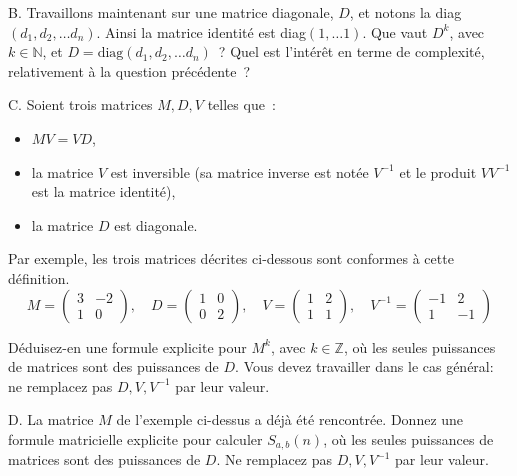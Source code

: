 \documentclass[11pt]{article}
\newcommand\comment{}
\def\N{\mathbb N}
\def\R{\mathbb R}
\def\Z{\mathbb Z}
\begin{document}
\medskip
B. Travaillons maintenant sur une matrice diagonale, $D$, et
notons la diag$(d_1, d_2, \ldots d_n)$. Ainsi la matrice identité est 
diag$(1, \ldots 1)$. Que vaut $D^k$, avec $k\in \N$, et $D=\mbox{diag}(d_1, d_2, \ldots d_n)$~?
Quel est l'intérêt en terme de complexité, relativement à la question précédente~?

\medskip
C. Soient trois matrices $M, D, V$ telles que~: 

\begin{itemize}

\item $MV=VD$,
\item la matrice $V$ est inversible (sa matrice inverse est notée  $V^{-1}$ et le produit $V V^{-1}$ est la matrice identité),
\item la matrice $D$ est diagonale.

\end{itemize}

\medskip
{Par exemple, les trois matrices décrites ci-dessous sont 
conformes à cette définition.}
$$M=\left( \begin{array}{cc} 3 & -2\\
1 & 0 
\end{array}\right), \quad D=\left( \begin{array}{cc} 1 & 0 \\
0 & 2 \end{array}\right), \quad V=\left( \begin{array}{cc} 1 & 2 \\
1  & 1 \end{array}\right), \quad V^{-1}=\left( \begin{array}{cc} -1 & 2 \\
1  & -1 \end{array}\right) $$
 


Déduisez-en une formule explicite pour $M^k$, avec $k\in \Z$,
où les seules puissances de matrices sont des puissances de $D$.
Vous devez travailler dans le cas général: ne remplacez pas $D, V, V^{-1}$ par leur valeur.


\medskip
D. La matrice $M$ de l'exemple ci-dessus a déjà été rencontrée. Donnez une formule matricielle explicite pour calculer $S_{a,b}(n)$, où les seules puissances de matrices sont des puissances de $D$.
Ne remplacez pas $D, V, V^{-1}$ par leur valeur.
\end{document}
